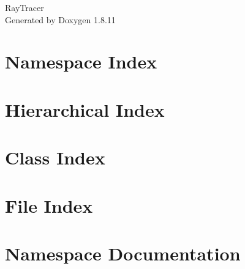 \documentclass[twoside]{book}
\newcommand{\+}{\discretionary{\mbox{\scriptsize$\hookleftarrow$}}{}{}}
\newcommand{\clearemptydoublepage}{%
  \newpage{\pagestyle{empty}\cleardoublepage}%
}
\begin{document}
\hypersetup{pageanchor=false,
             bookmarksnumbered=true,
             pdfencoding=unicode
            }
\begin{titlepage}
\vspace*{7cm}
\begin{center}%
{\Large Ray\+Tracer }\\
\vspace*{1cm}
{\large Generated by Doxygen 1.8.11}\\
\end{center}
\end{titlepage}
\clearemptydoublepage
\tableofcontents
\clearemptydoublepage
{}
\hypersetup{pageanchor=true}

\chapter{Namespace Index}

\chapter{Hierarchical Index}

\chapter{Class Index}

\chapter{File Index}

\chapter{Namespace Documentation}




\end{document}
